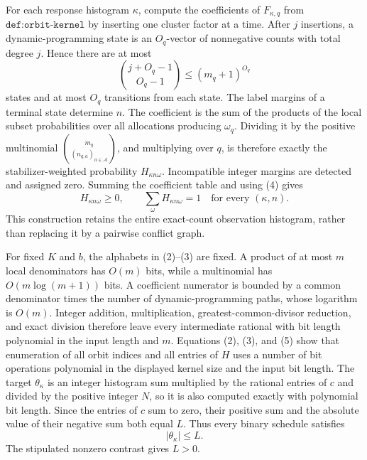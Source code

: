 For each response histogram \(\kappa\), compute the coefficients of \(F_{\kappa,q}\) from \(\texttt{def:orbit-kernel}\) by inserting one cluster factor at a time.  After \(j\) insertions, a dynamic-programming state is an \(O_q\)-vector of nonnegative counts with total degree \(j\).  Hence there are at most
\[
 \binom{j+O_q-1}{O_q-1}\le (m_q+1)^{O_q}
\tag{5}
\]
states and at most \(O_q\) transitions from each state.  The label margins of a terminal state determine \(n\).  The coefficient is the sum of the products of the local subset probabilities over all allocations producing \(\omega_q\).  Dividing it by the positive multinomial \(\binom{m_q}{(n_{q,a})_{a\in\mathcal A}}\), and multiplying over \(q\), is therefore exactly the stabilizer-weighted probability \(H_{\kappa n\omega}\).  Incompatible integer margins are detected and assigned zero.  Summing the coefficient table and using (4) gives
\[
 H_{\kappa n\omega}\ge0,
 \qquad
 \sum_{\omega}H_{\kappa n\omega}=1
 \quad\text{for every }(\kappa,n).
\tag{6}
\]
This construction retains the entire exact-count observation histogram, rather than replacing it by a pairwise conflict graph.

For fixed \(K\) and \(b\), the alphabets in (2)--(3) are fixed.  A product of at most \(m\) local denominators has \(O(m)\) bits, while a multinomial has \(O(m\log(m+1))\) bits.  A coefficient numerator is bounded by a common denominator times the number of dynamic-programming paths, whose logarithm is \(O(m)\).  Integer addition, multiplication, greatest-common-divisor reduction, and exact division therefore leave every intermediate rational with bit length polynomial in the input length and \(m\).  Equations (2), (3), and (5) show that enumeration of all orbit indices and all entries of \(H\) uses a number of bit operations polynomial in the displayed kernel size and the input bit length.  The target \(\theta_\kappa\) is an integer histogram sum multiplied by the rational entries of \(c\) and divided by the positive integer \(N\), so it is also computed exactly with polynomial bit length.  Since the entries of \(c\) sum to zero, their positive sum and the absolute value of their negative sum both equal \(L\).  Thus every binary schedule satisfies
\[
 |\theta_\kappa|\le L.
\tag{7}
\]
The stipulated nonzero contrast gives \(L>0\).

